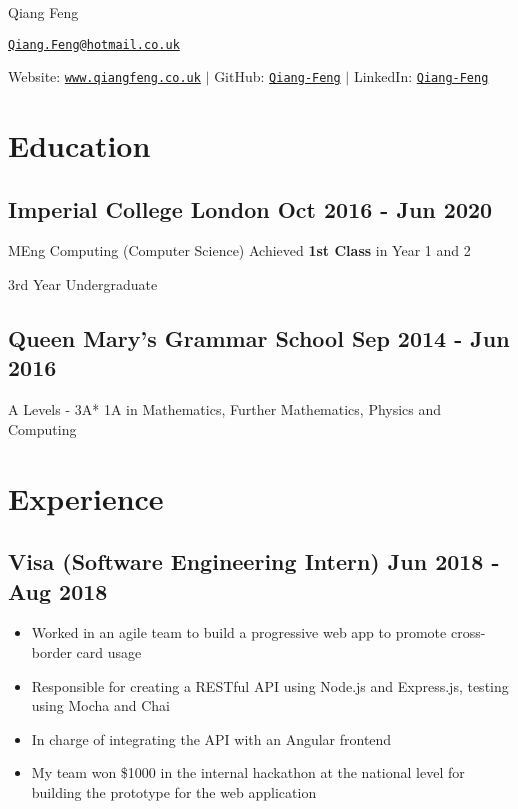 \documentclass[a4paper]{article}
\begin{document}
\begin{center}
    {\huge Qiang Feng}

    \vspace{2pt}

    \href{mailto:Qiang.Feng@hotmail.co.uk}{\texttt{Qiang.Feng@hotmail.co.uk}}

    \vspace{2pt}

    Website: \href{https://www.qiangfeng.co.uk}{\texttt{www.qiangfeng.co.uk}} $\mid$
    GitHub: \href{https://github.com/Qiang-Feng}{\texttt{Qiang-Feng}} $\mid$
    LinkedIn: \href{https://www.linkedin.com/in/qiang-feng/}{\texttt{Qiang-Feng}}
\end{center}

\section*{Education}

\subsection*{Imperial College London \hfill Oct 2016 - Jun 2020}

MEng Computing (Computer Science) \hfill Achieved \textbf{1st Class} in Year 1 and 2

3rd Year Undergraduate

\subsection*{Queen Mary's Grammar School \hfill Sep 2014 - Jun 2016}

A Levels - 3A* 1A in Mathematics, Further Mathematics, Physics and Computing

\section*{Experience}

\subsection*{Visa \textnormal{(Software Engineering Intern)} \hfill Jun 2018 - Aug 2018}

\begin{itemize}
    \item Worked in an agile team to build a progressive web app to promote cross-border card usage
    \item Responsible for creating a RESTful API using Node.js and Express.js, testing using Mocha and Chai
    \item In charge of integrating the API with an Angular frontend
    \item My team won \$1000 in the internal hackathon at the national level for building the prototype for the web application
\end{itemize}
\end{document}
